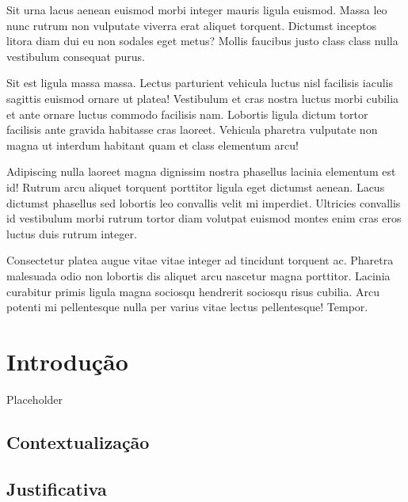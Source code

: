 \documentclass[grad,numbers]{coppe}
\begin{document}
  \begin{foreignabstract}
Sit urna lacus aenean euismod morbi integer mauris ligula euismod. Massa leo nunc rutrum non vulputate viverra erat aliquet torquent. Dictumst inceptos litora diam dui eu non sodales eget metus? Mollis faucibus justo class class nulla vestibulum consequat purus.

Sit est ligula massa massa. Lectus parturient vehicula luctus nisl facilisis iaculis sagittis euismod ornare ut platea! Vestibulum et cras nostra luctus morbi cubilia et ante ornare luctus commodo facilisis nam. Lobortis ligula dictum tortor facilisis ante gravida habitasse cras laoreet. Vehicula pharetra vulputate non magna ut interdum habitant quam et class elementum arcu!

Adipiscing nulla laoreet magna dignissim nostra phasellus lacinia elementum est id! Rutrum arcu aliquet torquent porttitor ligula eget dictumst aenean. Lacus dictumst phasellus sed lobortis leo convallis velit mi imperdiet. Ultricies convallis id vestibulum morbi rutrum tortor diam volutpat euismod montes enim cras eros luctus duis rutrum integer.

Consectetur platea augue vitae vitae integer ad tincidunt torquent ac. Pharetra malesuada odio non lobortis dis aliquet arcu nascetur magna porttitor. Lacinia curabitur primis ligula magna sociosqu hendrerit sociosqu risus cubilia. Arcu potenti mi pellentesque nulla per varius vitae lectus pellentesque! Tempor.
  \end{foreignabstract}
  \tableofcontents

  \listoffigures

  \listoftables

  \printlosymbols
  \printloabbreviations

  \mainmatter

  \hypertarget{introduuxe7uxe3o}{%
  \chapter{Introdução}\label{introduuxe7uxe3o}}

  Placeholder

  \hypertarget{contextualizauxe7uxe3o}{%
  \section{Contextualização}\label{contextualizauxe7uxe3o}}

  \hypertarget{justificativa}{%
  \section{Justificativa}\label{justificativa}}
\end{document}
